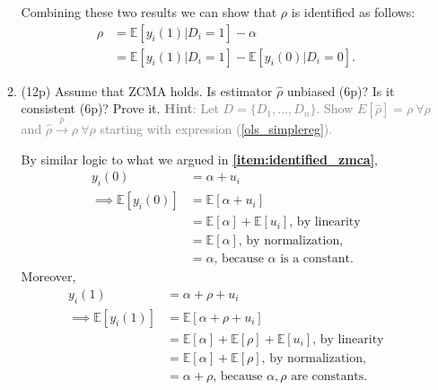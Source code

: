 \documentclass{article}
\begin{document}
\begin{enumerate}[label=\textbf{Q\arabic{enumi}}.,ref=Q\arabic{enumi}, wide=0pt, itemsep=1em, topsep=5pt]
\begin{enumerate}
\begin{solution}
{        Combining these two results we can show that $\rho$ is identified as follows: 
        \begin{align*}
            \rho &= \mathbb{E}[y_i(1) | D_i = 1] - \alpha\\
            &= \mathbb{E}[y_i(1) | D_i = 1] - \mathbb{E}[y_i(0) | D_i = 0].
        \end{align*}
        }
        \end{solution}

        \item (12p) Assume that ZCMA holds. Is estimator $\widehat{\rho }$ unbiased (6p)? Is it consistent (6p)? Prove it. \textcolor{gray}{\textbf{Hint}: Let $D=\{D_1,\dots,D_n\}$. Show $E[\widehat{\rho}]=\rho \ \forall \rho$ and $\widehat{\rho} \overset{p}{\rightarrow }\rho \ \forall \rho$ starting with expression (\ref{ols_simplereg}).}\label{item:ols:statistical-properties}

        \begin{solution}
            {
            By similar logic to what we argued in \textbf{\ref{item:identified_zmca}}, 
            \begin{align*}
            y_i(0) &= \alpha + u_i \\
            \implies \mathbb{E}[y_i(0)] &= \mathbb{E}[\alpha + u_i]\\ 
             &= \mathbb{E}[\alpha] + \mathbb{E}[u_i] \text{, by linearity}\\
             &= \mathbb{E}[\alpha] \text{, by normalization, }\\
             &= \alpha \text{, because $\alpha$ is a constant. }
        \end{align*}
        \medskip 
        Moreover,
        \begin{align*}
            y_i(1) &= \alpha + \rho + u_i \\
            \implies \mathbb{E}[y_i(1)] &= \mathbb{E}[\alpha + \rho + u_i]\\ 
             &= \mathbb{E}[\alpha] + \mathbb{E}[\rho] + \mathbb{E}[u_i] \text{, by linearity}\\
             &= \mathbb{E}[\alpha] + \mathbb{E}[\rho] \text{, by normalization, }\\
             &= \alpha + \rho \text{, because $\alpha, \rho$ are constants. }
        \end{align*}
            
}
\end{solution}
\end{enumerate}
\end{enumerate}
\end{document}
